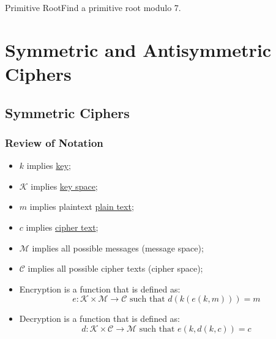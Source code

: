 \begin{example}
    {Primitive Root}Find a primitive root modulo 7.
\end{example}



\section{Symmetric and Antisymmetric Ciphers}

\subsection{Symmetric Ciphers}


\begin{center}
    \subsubsection{Review of Notation}
\end{center}

\begin{itemize}
    \item \(k\) implies \hyperlink{Key}{key};
    \item \(\mathcal{K}\) implies \hyperlink{Key Space}{key space};
    \item \(m\) implies plaintext \hyperlink{Plain Text}{plain text};
    \item \(c\) implies \hyperlink{Cipher Text}{cipher text};
    \item \(\mathcal{M}\) implies all possible messages (message space);
    \item \(\mathcal{C}\) implies all possible cipher texts (cipher space);
    \item Encryption is a function that is defined as: \[e: \mathcal{K} \times \mathcal{M} \rightarrow \mathcal{C} \text{ such that } d(k(e(k,m))) = m\]
    \item Decryption is a function that is defined as: \[d: \mathcal{K} \times \mathcal{C} \rightarrow \mathcal{M} \text{ such that } e(k,d(k,c)) = c\]
\end{itemize}
\hypertarget{Successful Ciphers}{}
